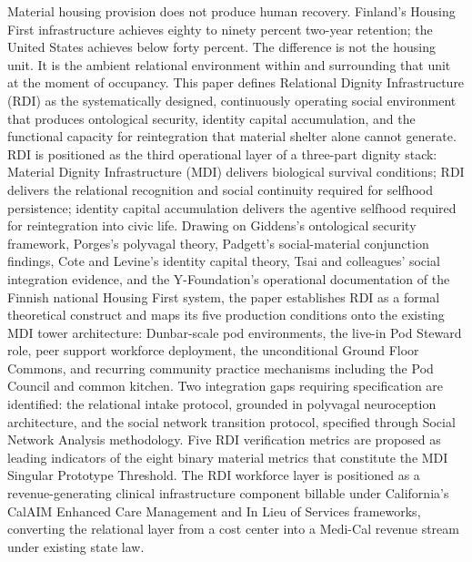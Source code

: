 \documentclass[12pt, letterpaper]{article}
\begin{document}
\begin{titlepage}
\begin{minipage}{0.95\textwidth}
Material housing provision does not produce human recovery. Finland's Housing First infrastructure achieves eighty to ninety percent two-year retention; the United States achieves below forty percent. The difference is not the housing unit. It is the ambient relational environment within and surrounding that unit at the moment of occupancy. This paper defines Relational Dignity Infrastructure (RDI) as the systematically designed, continuously operating social environment that produces ontological security, identity capital accumulation, and the functional capacity for reintegration that material shelter alone cannot generate. RDI is positioned as the third operational layer of a three-part dignity stack: Material Dignity Infrastructure (MDI) delivers biological survival conditions; RDI delivers the relational recognition and social continuity required for selfhood persistence; identity capital accumulation delivers the agentive selfhood required for reintegration into civic life. Drawing on Giddens's ontological security framework, Porges's polyvagal theory, Padgett's social-material conjunction findings, Cote and Levine's identity capital theory, Tsai and colleagues' social integration evidence, and the Y-Foundation's operational documentation of the Finnish national Housing First system, the paper establishes RDI as a formal theoretical construct and maps its five production conditions onto the existing MDI tower architecture: Dunbar-scale pod environments, the live-in Pod Steward role, peer support workforce deployment, the unconditional Ground Floor Commons, and recurring community practice mechanisms including the Pod Council and common kitchen. Two integration gaps requiring specification are identified: the relational intake protocol, grounded in polyvagal neuroception architecture, and the social network transition protocol, specified through Social Network Analysis methodology. Five RDI verification metrics are proposed as leading indicators of the eight binary material metrics that constitute the MDI Singular Prototype Threshold. The RDI workforce layer is positioned as a revenue-generating clinical infrastructure component billable under California's CalAIM Enhanced Care Management and In Lieu of Services frameworks, converting the relational layer from a cost center into a Medi-Cal revenue stream under existing state law.

\end{minipage}
\end{titlepage}

\end{document}
